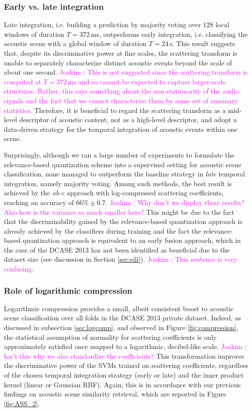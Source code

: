 \documentclass[journal]{IEEEtran}
\makeatletter
\newcommand*{\ie}{i.e.\@\xspace}
\newcommand*{\vs}{vs.\@\xspace}
\newcommand{\ja}[1]{\textcolor{magenta}{Joakim : #1}}
\makeatother
\begin{document}
\subsubsection*{Early \vs late integration}
Late integration, \ie building a prediction by majority voting over $128$ local windows of duration $T=372\,\mathrm{ms}$, outperforms early integration, \ie classifying the acoustic scene with a global window of duration $T=24\,\mathrm{s}$.
This result suggests that, despite its discriminative power at fine scales, the scattering transform is unable to separately characterize distinct acoustic events beyond the scale of about one second. \ja{This is not suggested since the scattering transform is computed at $T=372\,\mathrm{ms}$ and so cannot be expected to capture larger-scale structures. Rather, this says something about the non-stationarity of the audio signals and the fact that we cannot characterize them by some set of summary statistics.}
Therefore, it is beneficial to regard the scattering transform as a mid-level descriptor of acoustic content, not as a high-level descriptor, and adopt a data-driven strategy for the temporal integration of acoustic events within one scene.

Surprisingly, although we ran a large number of experiments to formulate the relevance-based quantization scheme into a supervised setting for acoustic scene classification, none managed to outperform the baseline strategy in \emph{late} temporal integration, namely majority voting. Among such methods, the best result is achieved by the \emph{ob-c} approach with log-compressed scattering coefficients, reaching an accuracy of $66\% \pm0.7$. \ja{Why don't we display these results? Also how is the variance so much smaller here?} This might be due to the fact that the discriminability gained by the relevance-based quantization approach is already achieved by the classifiers during training and the fact the relevance-based quantization approach is equivalent to an early fusion approach, which in the case of the DCASE 2013 has not been identified as beneficial due to the dataset size (see discussion in Section \ref{sec:eili}). \ja{This sentence is very confusing.}

\subsubsection*{Role of logarithmic compression}

Logarithmic compression provides a small, albeit consistent boost to acoustic scene classification over all folds in the DCASE 2013 private dataset.
Indeed, as discussed in subsection \ref{sec:logcomp}, and observed in Figure \ref{fig:compression}, the statistical assumption of normality for scattering coefficients is only approximately satisfied once mapped to a logarithmic, decibel-like scale. \ja{Isn't this why we also standardize the coefficients?}
This transformation improves the discriminative power of the SVMs trained on scattering coefficients, regardless of the chosen temporal integration strategy (early or late) and the inner product kernel (linear or Gaussian RBF).
Again, this is in accordance with our previous findings on acoustic scene similarity retrieval, which are reported in Figure \ref{fig:ASS_2}.
\end{document}
